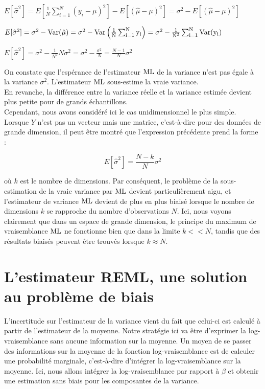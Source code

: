 $E[\hat{\sigma}^2]=E\left[\frac{1}{N}\sum_{i=1}^N(y_i-\mu)^2\right]-E[(\hat{\mu}-\mu)^2]=\sigma^2-E[(\hat{\mu}-\mu)^2]$

$E[\hat{\sigma}^2]=\sigma^2-\rm{Var}(\hat{\mu})=\sigma^2-\rm{Var}\left(\frac{1}{N}\sum_{i=1}^N{y_i}\right)=\sigma^2-\frac{1}{N^2}\sum_{i=1}^N{\rm{Var}(y_i)}$

$E[\hat{\sigma}^2]=\sigma^2-\frac{1}{N^2}N\sigma^2=\sigma^2-\frac{\sigma^2}{N}=\frac{N-1}{N}\sigma^2$

\vspace{4mm}

On constate que l'espérance de l'estimateur $\rm{ML}$ de la variance n'est pas égale à la variance $\sigma^2$. L'estimateur $\rm{ML}$  sous-estime la vraie variance.\\
En revanche, la différence entre la variance réelle et la variance estimée devient plus petite pour de grands échantillons.\\ 
Cependant, nous avons considéré ici le cas unidimensionnel le plus simple. Lorsque $ Y $ n'est pas un vecteur mais une matrice, c'est-à-dire pour des données de grande dimension, il peut être montré que l'expression précédente prend la forme :

$$
E[\hat{\sigma}^2]=\frac{N-k}{N}\sigma^2
$$

où $k$ est le nombre de dimensions. Par conséquent, le problème de la sous-estimation de la vraie variance par $\rm{ML}$ devient particulièrement aigu, et l'estimateur de variance $\rm{ML}$ devient de plus en plus biaisé lorsque le nombre de dimensions $ k $ se rapproche du nombre d'observations $ N $. Ici, nous voyons clairement que dans un espace de grande dimension, le principe du maximum de vraisemblance $\rm{ML}$ ne fonctionne bien que dans la limite $ k << N $, tandis que des résultats biaisés peuvent être trouvés lorsque $ k \approx N $.

\section{L'estimateur REML, une solution au problème de biais}

L'incertitude sur l'estimateur de la variance vient du fait que celui-ci est calculé à partir de l'estimateur de la moyenne. Notre stratégie ici va être d'exprimer la log-vraisemblance sans aucune information sur la moyenne. Un moyen de se passer des informations sur la moyenne de la fonction log-vraisemblance est de calculer une probabilité marginale, c'est-à-dire d'intégrer la log-vraisemblance sur la moyenne. Ici, nous allons intégrer la log-vraisemblance par rapport à $\beta$ et obtenir une estimation sans biais pour les composantes de la variance.

